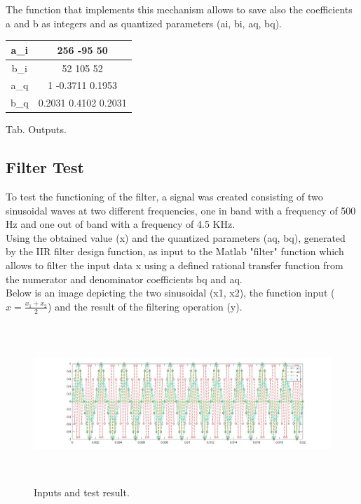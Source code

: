 The function that implements this mechanism allows to save also the coefficients a and b as integers and as quantized parameters (ai, bi, aq, bq).

\begin{center}
    \begin{tabular}{ |c|c| } 
        \hline
            a_i & 256 -95 50\\
            \hline
            b_i & 52 105 52\\
            \hline
            a_q & 1 -0.3711 0.1953\\
            \hline
            b_q & 0.2031 0.4102 0.2031\\
        \hline
    \end{tabular}
    \begin{center}
    Tab. Outputs.
    \end{center}
\end{center}

\subsection{Filter Test}

To test the functioning of the filter, a signal was created consisting of two sinusoidal waves at two different frequencies, one in band with a frequency of 500 Hz and one out of band with a frequency of 4.5 KHz.\\
Using the obtained value (x) and the quantized parameters (aq, bq), generated by the IIR filter design function, as input to the Matlab "filter" function which allows to filter the input data x using a defined rational transfer function from the numerator and denominator coefficients bq and aq.\\
Below is an image depicting the two sinusoidal (x1, x2), the function input (\( x = \frac{x_1 + x_2}{2}\)) and the result of the filtering operation (y).

\begin{figure}[H]
	\centering
	\includegraphics[width=\textwidth, height=6cm]{img/test.jpg} 
	\caption{Inputs and test result.}
	\label{fig:Inputs and test result} 
\end{figure}

